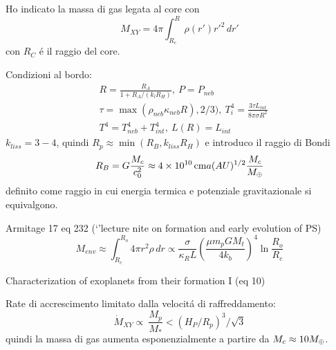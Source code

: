 Ho indicato la massa di gas legata al core con
\begin{equation}
M_{XY}=4\pi\int_{R_c}^R\rho(r')r'^2\,dr'
\end{equation}
con $R_C$ \'e il raggio del core.

Condizioni al bordo:
\begin{align}
&R=\frac{R_A}{1+R_A/(k_lR_H )},\ P=P_{neb}\\
&\tau=\max{(\rho_{neb}\kappa_{neb}R),2/3)},\ T_i^4=\frac{3\tau L_{int}}{8\pi\sigma R^2}\\
&T^4=T_{neb}^4+T_{int}^4,\ L(R)=L_{int}
\end{align}
$k_{liss}=3-4$, quindi $R_p\approx \min{(R_B,k_{liss}R_H)}$ e introduco il raggio di Bondi
\begin{equation}
R_B=G\frac{M_c}{c_0^2}\approx\SI{4e10}{\cm}a(AU)\expy{1/2}\frac{M_c}{\mearth{}}
\end{equation}
definito come raggio in cui energia termica e potenziale gravitazionale si equivalgono.%

\begin{workout}
Armitage 17 eq 232 (`'lecture nite on formation and early evolution of PS)
\begin{equation}
M_{env}\approx\int_{R_c}^{R_o}4\pi r^2\rho\,dr\propto\frac{\sigma}{\kappa_RL}(\frac{\mu m_pGM_t}{4k_b})^4\ln{\frac{R_o}{R_c}}
\end{equation}
\end{workout}

\begin{workout}

\end{workout}


\begin{workout}
Characterization of exoplanets from their formation I (eq 10)
\end{workout}

Rate di accrescimento limitato dalla velocit\'a di raffreddamento:
\begin{equation}
\dot{M}_{XY}\propto\ \frac{M_p}{M_*}<(H_P/R_p)^3/\sqrt{3}
\end{equation}
quindi la massa di gas aumenta esponenzialmente a partire da $M_c\approx10M_{\oplus}{}$.

\begin{workout}

\end{workout}

